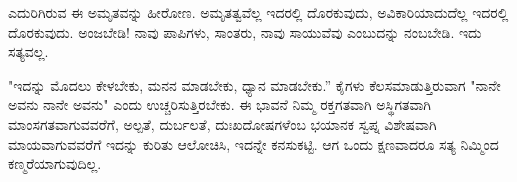 ಎದುರಿಗಿರುವ ಈ ಅಮೃತವನ್ನು ಹೀರೋಣ. ಅಮೃತತ್ವವೆಲ್ಲ ಇದರಲ್ಲಿ ದೊರಕುವುದು, ಅವಿಕಾರಿಯಾದುದೆಲ್ಲ ಇದರಲ್ಲಿ ದೊರಕುವುದು. ಅಂಜಬೇಡಿ! ನಾವು ಪಾಪಿಗಳು, ಸಾಂತರು, ನಾವು ಸಾಯುವೆವು ಎಂಬುದನ್ನು ನಂಬಬೇಡಿ. ಇದು ಸತ್ಯವಲ್ಲ.

"ಇದನ್ನು ಮೊದಲು ಕೇಳಬೇಕು, ಮನನ ಮಾಡಬೇಕು, ಧ್ಯಾನ ಮಾಡಬೇಕು.'' ಕೈಗಳು ಕೆಲಸಮಾಡುತ್ತಿರುವಾಗ "ನಾನೇ ಅವನು ನಾನೇ ಅವನು" ಎಂದು ಉಚ್ಚರಿಸುತ್ತಿರಬೇಕು. ಈ ಭಾವನೆ ನಿಮ್ಮ ರಕ್ತಗತವಾಗಿ ಅಸ್ಥಿಗತವಾಗಿ ಮಾಂಸಗತವಾಗುವವರೆಗೆ, ಅಲ್ಪತೆ, ದುರ್ಬಲತೆ, ದುಃಖದೋಷಗಳೆಂಬ ಭಯಾನಕ ಸ್ವಪ್ನ ವಿಶೇಷವಾಗಿ ಮಾಯವಾಗುವವರೆಗೆ ಇದನ್ನು ಕುರಿತು ಆಲೋಚಿಸಿ, ಇದನ್ನೇ ಕನಸುಕಟ್ಟಿ. ಆಗ ಒಂದು ಕ್ಷಣವಾದರೂ ಸತ್ಯ ನಿಮ್ಮಿಂದ ಕಣ್ಮರೆಯಾಗುವುದಿಲ್ಲ.

